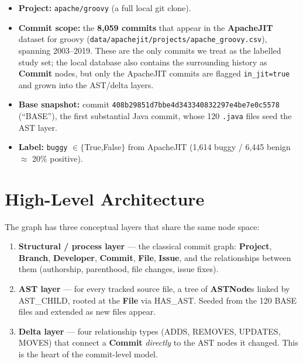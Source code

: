 \documentclass[11pt,a4paper]{article}
\newcommand{\code}[1]{\texttt{#1}}
\newcommand{\node}[1]{\textcolor{kgblue}{\textbf{#1}}}
\newcommand{\edge}[1]{\textsc{#1}}
\begin{document}
\begin{itemize}[nosep]
  \item \textbf{Project:} \texttt{apache/groovy} (a full local git clone).
  \item \textbf{Commit scope:} the \textbf{8{,}059 commits} that appear in the
        \textbf{ApacheJIT} dataset for groovy
        (\texttt{data/apachejit/projects/apache\_groovy.csv}), spanning
        2003--2019. These are the only commits we treat as the labelled study
        set; the local database also contains the surrounding history as
        \node{Commit} nodes, but only the ApacheJIT commits are flagged
        \code{in\_jit=true} and grown into the AST/delta layers.
  \item \textbf{Base snapshot:} commit
        \texttt{408b29851d7bbe4d343340832297e4be7e0c5578} (``BASE''), the first
        substantial Java commit, whose 120 \texttt{.java} files seed the AST
        layer.
  \item \textbf{Label:} \texttt{buggy} $\in\{$True,False$\}$ from ApacheJIT
        (1{,}614 buggy / 6{,}445 benign $\approx$ 20\% positive).
\end{itemize}

\section{High-Level Architecture}
The graph has three conceptual layers that share the same node space:

\begin{enumerate}[nosep]
  \item \textbf{Structural / process layer} --- the classical commit graph:
        \node{Project}, \node{Branch}, \node{Developer}, \node{Commit},
        \node{File}, \node{Issue}, and the relationships between them
        (authorship, parenthood, file changes, issue fixes).
  \item \textbf{AST layer} --- for every tracked source file, a tree of
        \node{ASTNode}s linked by \edge{AST\_CHILD}, rooted at the \node{File}
        via \edge{HAS\_AST}. Seeded from the 120 BASE files and extended as new
        files appear.
  \item \textbf{Delta layer} --- four relationship types
        (\edge{ADDS}, \edge{REMOVES}, \edge{UPDATES}, \edge{MOVES}) that connect
        a \node{Commit} \emph{directly} to the AST nodes it changed. This is the
        heart of the commit-level model.
\end{enumerate}
\end{document}
